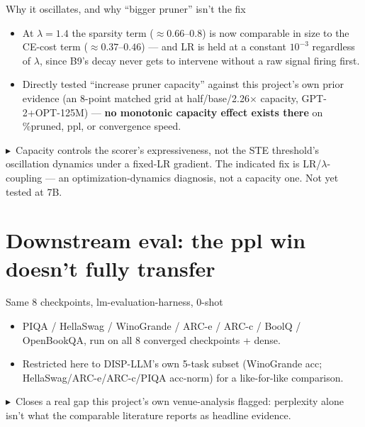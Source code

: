 \documentclass[10pt,aspectratio=169]{beamer}
\newcommand{\tk}[1]{{\scriptsize \textcolor{accent}{$\blacktriangleright$}\ #1}}
\begin{document}
\begin{frame}{Why it oscillates, and why ``bigger pruner'' isn't the fix}
  \begin{itemize}
    \item At $\lambda{=}1.4$ the sparsity term ($\approx 0.66$--$0.8$) is now comparable in size to the CE-cost term ($\approx 0.37$--$0.46$) --- and LR is held at a constant $10^{-3}$ regardless of $\lambda$, since B9's decay never gets to intervene without a raw signal firing first.
    \item Directly tested ``increase pruner capacity'' against this project's own prior evidence (an 8-point matched grid at half/base/2.26$\times$ capacity, GPT-2+OPT-125M) --- \textbf{no monotonic capacity effect exists there} on \%pruned, ppl, or convergence speed.
  \end{itemize}
  \vspace{0.4em}
  \tk{Capacity controls the scorer's expressiveness, not the STE threshold's oscillation dynamics under a fixed-LR gradient. The indicated fix is LR/$\lambda$-coupling --- an optimization-dynamics diagnosis, not a capacity one. Not yet tested at 7B.}
\end{frame}

\section{Downstream eval: the ppl win doesn't fully transfer}

\begin{frame}{Same 8 checkpoints, lm-evaluation-harness, 0-shot}
  \begin{itemize}
    \item PIQA / HellaSwag / WinoGrande / ARC-e / ARC-c / BoolQ / OpenBookQA, run on all 8 converged checkpoints + dense.
    \item Restricted here to DISP-LLM's own 5-task subset (WinoGrande acc; HellaSwag/ARC-e/ARC-c/PIQA acc-norm) for a like-for-like comparison.
  \end{itemize}
  \vspace{0.4em}
  \tk{Closes a real gap this project's own venue-analysis flagged: perplexity alone isn't what the comparable literature reports as headline evidence.}
\end{frame}
\end{document}
